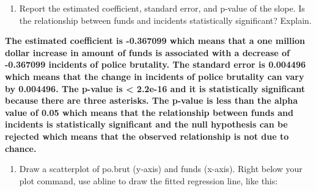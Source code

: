 \documentclass[
]{article}
\newenvironment{Shaded}{\begin{snugshade}}{\end{snugshade}}
\newcommand{\AttributeTok}[1]{\textcolor[rgb]{0.77,0.63,0.00}{#1}}
\newcommand{\DecValTok}[1]{\textcolor[rgb]{0.00,0.00,0.81}{#1}}
\newcommand{\FunctionTok}[1]{\textcolor[rgb]{0.00,0.00,0.00}{#1}}
\newcommand{\NormalTok}[1]{#1}
\newcommand{\SpecialCharTok}[1]{\textcolor[rgb]{0.00,0.00,0.00}{#1}}
\newcommand{\StringTok}[1]{\textcolor[rgb]{0.31,0.60,0.02}{#1}}
\providecommand{\tightlist}{%
  \setlength{\itemsep}{0pt}\setlength{\parskip}{0pt}}
\begin{document}
\begin{enumerate}
\def\labelenumi{\alph{enumi}.}
\setcounter{enumi}{1}
\tightlist
\item
  Report the estimated coefficient, standard error, and p-value of the
  slope. Is the relationship between funds and incidents statistically
  significant? Explain.
\end{enumerate}

\textbf{The estimated coefficient is -0.367099 which means that a one
million dollar increase in amount of funds is associated with a decrease
of -0.367099 incidents of police brutality. The standard error is
0.004496 which means that the change in incidents of police brutality
can vary by 0.004496. The p-value is \textless{} 2.2e-16 and it is
statistically significant because there are three asterisks. The p-value
is less than the alpha value of 0.05 which means that the relationship
between funds and incidents is statistically significant and the null
hypothesis can be rejected which means that the observed relationship is
not due to chance. }

\begin{enumerate}
\def\labelenumi{\alph{enumi}.}
\setcounter{enumi}{2}
\tightlist
\item
  Draw a scatterplot of po.brut (y-axis) and funds (x-axis). Right below
  your plot command, use abline to draw the fitted regression line, like
  this:
\end{enumerate}

\begin{Shaded}
\end{Shaded}
\end{document}

